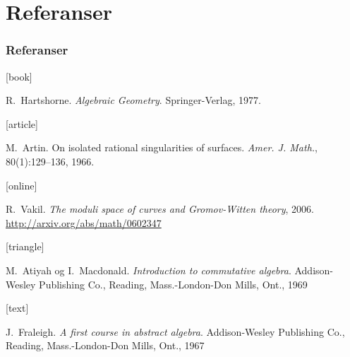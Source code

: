 \documentclass[norsk]{beamer}
\begin{document}
\section{Referanser}

\begin{frame}[allowframebreaks]
    \frametitle{Referanser}    
    
    \begin{thebibliography}{}    

        [book] 
        
        R.~Hartshorne.
        \newblock \emph{Algebraic Geometry}.
        \newblock Springer-Verlag, 1977.
       
        [article]
        
        M.~Artin.
        \newblock On isolated rational singularities of surfaces.
        \newblock \emph{Amer. J. Math.}, 80(1):129--136, 1966.  
       
       [online]
        
       R.~Vakil.
       \newblock \emph{The moduli space of curves and Gromov-Witten theory}, 2006.
       \newblock \url{http://arxiv.org/abs/math/0602347}
       
       [triangle]
       
       M.~Atiyah og I.~Macdonald.
       \newblock \emph{Introduction to commutative algebra}.
       \newblock Addison-Wesley Publishing Co., Reading, Mass.-London-Don
       Mills, Ont., 1969
           
       [text]
       
       J.~Fraleigh.
       \newblock \emph{A first course in abstract algebra}.
       \newblock Addison-Wesley Publishing Co., Reading, Mass.-London-Don Mills, Ont., 1967
    \end{thebibliography}
\end{frame}
\end{document}
